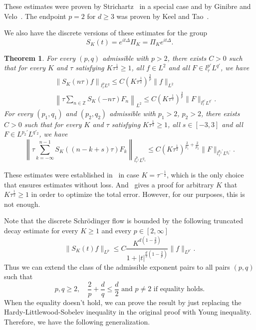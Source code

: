\documentclass[10pt,a4paper]{article}
\newtheorem{theorem}{Theorem}[section]
\begin{document}
  These estimates were proven by Strichartz~\cite{Sz77} in a special case and by
  Ginibre and Velo~\cite{GiVl85}. The endpoint \(p=2\) for \(d \geq 3\) was proven by
  Keel and Tao~\cite{KeTa98}.

  We also have the discrete versions of these estimates for the group 
  \begin{equation}\label{SK}
    S_K(t) = e^{it\Delta} \Pi_K = \Pi_K e^{it\Delta}.
  \end{equation}

  \begin{theorem}\label{thmDSEold} %
    For every \((p,q)\) admissible with \(p>2\), there exists \(C>0\) such that
    for every \(K\) and \(\tau\) satisfying \(K\tau^\frac12 \geq 1\), all \(
    f \in L^2 \) and all \(F \in l^{p'}_\tau L^{q'}\), we have 
    \begin{eqnarray}
      \label{To} & & \left\| S_{K}(n \tau) f\right\|_{l^p_\tau L^q} \leq C(K\tau^\frac12)^{\frac2p} \|f\|_{L^2} \\
      \label{T*o} & & \left\| \tau\sum_{n \in \mathbb{Z}}  S_K (-n\tau) F_n \right\|_{L^2} \leq C (K\tau^\frac12)^\frac2p \|F\|_{l^{p'}_\tau L^{q'}}.
    \end{eqnarray}
    For every \((p_1, q_1)\) and \((p_2, q_2)\) admissible with \(p_1>2\),
    \(p_2>2\), there exists \(C > 0\) such that for every \(K\) and \(\tau\) 
    satisfying \(K\tau^\frac12 \geq 1\), all \( s \in [-3,3] \) and all 
    \(F \in L^{p_2'} L^{q'_2}\), we have
    \begin{equation}\label{TT*o}
      \left\| \tau \sum_{k = -\infty}^{n-1}  S_K ((n-k+s)\tau) F_k \right\|_{l^{p_1}_\tau L^{q_1}}
      \leq C (K\tau^\frac12)^{ \frac2{p_1} + \frac2{p_2} }  \|F\|_{l^{p_2'}_\tau L^{q_2'}}.
    \end{equation}
  \end{theorem}

  These estimates were established in~\cite{IgZz09} 
  in case \(K=\tau^{-\frac12}\), which is the only choice that ensures estimates 
  without loss. And~\cite{ORS21} gives a proof for arbitrary \(K\) that \(K\tau^\frac12 \geq 1\) 
  in order to optimize the total error. However, for our purposes, this is not enough.

  Note that the discrete Schr\"odinger flow is bounded by the following truncated
  decay estimate for every \(K\geq 1\) and every \(p \in [2,\infty]\)
  \[
    \|S_K(t)f\|_{L^p} \leq C \frac{K^{d(1-\frac2p)}}{1+|t|^{\frac{d}2(1-\frac2p)}} \|f\|_{L^{p'}}.
  \]
  Thus we can extend the class of the admissible exponent pairs to all pairs \((p,q)\)
  such that 
  \begin{equation}\label{weakly-admissible}
    p,q \geq 2 ,\quad \frac2p + \frac{d}q \leq \frac{d}2 \text{ and } p \neq 2 \text{ if
    equality holds.}
  \end{equation}
  When the equality doesn't hold, we can prove the result by just replacing the 
  Hardy-Littlewood-Sobelev inequality in the original proof with Young inequality. 
  Therefore, we have the following generalization.
\end{document}
